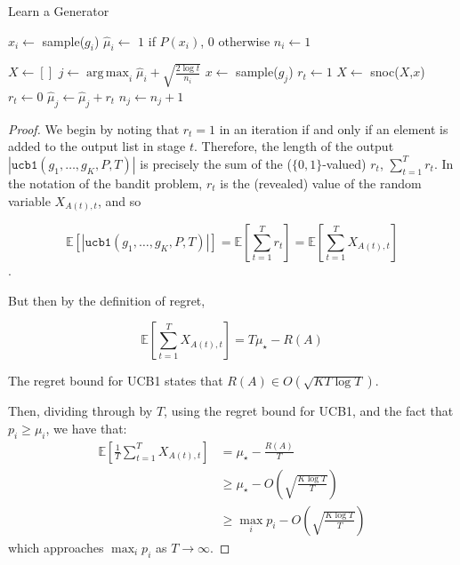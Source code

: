 \documentclass[sigconf,nonacm,review,anonymous]{acmart}
\DeclareMathOperator*{\argmax}{arg\,max}
\begin{document}
\begin{algorithm}
    \caption{Learn a Generator}
    \label{alg:ucb1}
    \begin{algorithmic}
      \State $x_i \gets $ sample($g_i$)
      \State $\hat{\mu}_i \gets$ $1$ if $P(x_i)$, $0$ otherwise
      \State $n_i \gets 1$

      \EndFor
      \State $X \gets []$
        \State $j \gets \argmax_i \hat{\mu}_i + \sqrt{\frac{2\log t}{n_i}}$
        \State $x \gets$ sample($g_j$)
          \State $r_t \gets 1$
          \State $X \gets$ snoc($X$,$x$)
        \Else
          \State $r_t \gets 0$
        \EndIf
        \State $\hat{\mu}_j \gets \hat{\mu}_j + r_t$
        \State $n_j \gets n_j + 1$
      \EndFor
      \EndFunction
    \end{algorithmic}
\end{algorithm}



\regretthm*
\begin{proof}
We begin by noting that $r_t = 1$ in an iteration if and only if an element is added to the output list in stage $t$. Therefore, the length of the output $\left|\texttt{ucb1}(g_1,\dots,g_K,P,T)\right|$ is precisely the sum of the ($\{0,1\}$-valued) $r_t$, $\sum_{t=1}^T r_t$. In the notation of the bandit problem, $r_t$ is the (revealed) value of the random variable $X_{A(t),t}$, and so 

$$\mathbb{E}\left[\left|\texttt{ucb1}(g_1,\dots,g_K,P,T)\right|\right] = \mathbb{E}\left[\sum_{t=1}^T r_t\right] = \mathbb{E}\left[\sum_{t=1}^T X_{A(t),t}\right]$$.

But then by the definition of regret,

$$
\mathbb{E}\left[\sum_{t=1}^T X_{A(t),t}\right] = T\mu_{\star} - R(A)
$$

The regret bound for UCB1 \cite[Theorem 7.2]{banditbook} states that $R(A) \in O\left(\sqrt{KT\log T}\right)$.

Then, dividing through by $T$, using the regret bound for UCB1, and the fact that $p_i \geq \mu_i$, we have that:
\begin{align*}
\mathbb{E}\left[\frac{1}{T}\sum_{t=1}^T X_{A(t),t}\right] &= \mu_\star - \frac{R(A)}{T}\\
&\geq \mu_{\star} - O\left(\sqrt{\frac{K\log T}{T}}\right)\\
&\geq \max_i p_i - O\left(\sqrt{\frac{K\log T}{T}}\right)
\end{align*}
which approaches $\max_i p_i$ as $T \to \infty$.
\end{proof}
\end{document}
